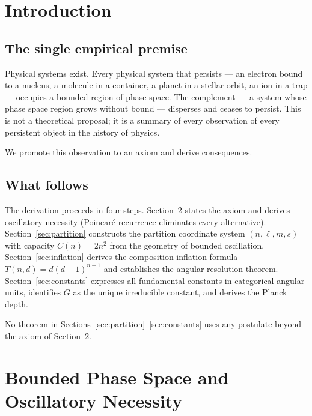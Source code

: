 \documentclass[twocolumn,10pt,a4paper]{article}
\theoremstyle{thmstyle}
\theoremstyle{definition}
\theoremstyle{remark}
\begin{document}
\tableofcontents

\section{Introduction}
\label{sec:introduction}

\subsection{The single empirical premise}

Physical systems exist. Every physical system that persists — an electron
bound to a nucleus, a molecule in a container, a planet in a stellar orbit,
an ion in a trap — occupies a bounded region of phase space. The complement
— a system whose phase space region grows without bound — disperses and ceases
to persist. This is not a theoretical proposal; it is a summary of every
observation of every persistent object in the history of physics.

We promote this observation to an axiom and derive consequences.

\subsection{What follows}

The derivation proceeds in four steps. Section~\ref{sec:foundations} states
the axiom and derives oscillatory necessity (Poincar\'e recurrence eliminates
every alternative). Section~\ref{sec:partition} constructs the partition
coordinate system $(n,\ell,m,s)$ with capacity $C(n) = 2n^2$ from
the geometry of bounded oscillation. Section~\ref{sec:inflation} derives
the composition-inflation formula $T(n,d) = d(d+1)^{n-1}$ and establishes
the angular resolution theorem. Section~\ref{sec:constants} expresses all
fundamental constants in categorical angular units, identifies $G$ as the
unique irreducible constant, and derives the Planck depth.

No theorem in Sections~\ref{sec:partition}--\ref{sec:constants} uses any
postulate beyond the axiom of Section~\ref{sec:foundations}.

\section{Bounded Phase Space and Oscillatory Necessity}
\label{sec:foundations}
\end{document}
